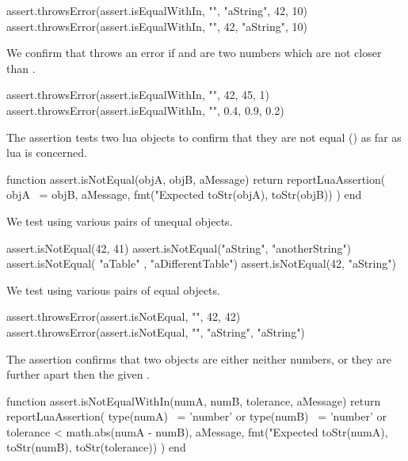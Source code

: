\startLuaTest
  assert.throwsError(assert.isEqualWithIn, "", "aString", 42, 10)
  assert.throwsError(assert.isEqualWithIn, "", 42, "aString", 10)
\stopLuaTest
\stopTestCase


We confirm that  throws an error if  
and  are two numbers which are not closer than 
. 

\startLuaTest
  assert.throwsError(assert.isEqualWithIn, "", 42, 45, 1)
  assert.throwsError(assert.isEqualWithIn, "", 0.4, 0.9, 0.2)
\stopLuaTest
\stopTestCase

\stopTestSuite


The  assertion tests two lua objects to confirm 
that they are not equal (\type{~=}) as far as lua is concerned. 

\startLuaCode
function assert.isNotEqual(objA, objB, aMessage)
  return reportLuaAssertion(
    objA ~= objB,
    aMessage,
    fmt("Expected %
      toStr(objA), toStr(objB))
  )
end
\stopLuaCode


We test using various pairs of unequal objects.

\startLuaTest
  assert.isNotEqual(42, 41)
  assert.isNotEqual("aString", "anotherString")
  assert.isNotEqual({ "aTable" }, { "aDifferentTable"})
  assert.isNotEqual(42, "aString")
\stopLuaTest
\stopTestCase


We test using various pairs of equal objects.

\startLuaTest
  assert.throwsError(assert.isNotEqual, "", 42, 42)
  assert.throwsError(assert.isNotEqual, "", "aString", "aString")
\stopLuaTest
\stopTestCase

\stopTestSuite


The  assertion confirms that two objects are 
either neither numbers, or they are further apart then the given 
. 

\startLuaCode
function assert.isNotEqualWithIn(numA, numB, tolerance, aMessage)
  return reportLuaAssertion(
    type(numA) ~= 'number' or type(numB) ~= 'number'
    or tolerance < math.abs(numA - numB), 
    aMessage,
    fmt("Expected %
      toStr(numA), toStr(numB), toStr(tolerance))
  )
end
\stopLuaCode

